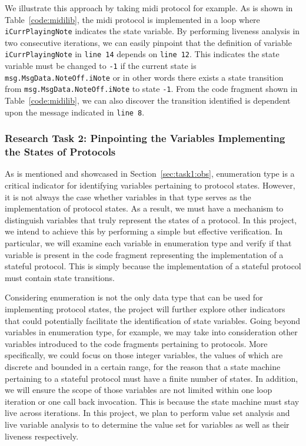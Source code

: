 We illustrate this approach by taking midi protocol for example. As is shown in
Table~\ref{code:midilib},  the midi protocol is implemented in a loop where
\texttt{iCurrPlayingNote} indicates the state variable. By performing liveness
analysis in two consecutive iterations, we can easily pinpoint that 
the definition of variable \texttt{iCurrPlayingNote} in
\texttt{line 14} depends on \texttt{line 12}.
This indicates the state variable must be changed to
\texttt{-1} if the current state is \texttt{msg.MsgData.NoteOff.iNote} or in
other words there exists a state transition from
\texttt{msg.MsgData.NoteOff.iNote} to state \texttt{-1}. From the code fragment
shown in Table~\ref{code:midilib}, we can also discover  the transition
identified is dependent upon the message indicated in \texttt{line 8}.




\subsubsection{Research Task 2: Pinpointing the Variables Implementing the
States of Protocols}
\label{subsec:rt2}

As is mentioned and showcased in Section~\ref{sec:task1:obs}, enumeration type
is a critical indicator for identifying variables pertaining to protocol states.
However, it is not always the case whether variables in that type serves as the
implementation of protocol states. As a result, we must have a mechanism to
distinguish variables that truly represent the states of a protocol. In this
project, we intend to achieve this by performing a simple but effective
verification. In particular, we will examine each variable in enumeration type
and verify if that variable is present in the code fragment representing the
implementation of a stateful protocol. This is simply because the implementation
of a stateful protocol must contain state transitions.

Considering enumeration is not the only data type that can be used for
implementing protocol states, the project will further explore other indicators
that could  potentially facilitate the identification of state variables. Going
beyond variables in enumeration type, for example, we may take into consideration
other variables introduced to the code fragments pertaining to protocols. More
specifically, we could focus on those integer variables, the values of which
are discrete and bounded in a certain range, for the reason that a state machine
pertaining to a stateful protocol must have a finite number of states. In
addition, we will ensure the scope of those variables are not limited within 
one loop iteration or one call back invocation. This is because the state machine must stay
live across iterations.
In this project, we plan to perform value set analysis
and live variable analysis to  to determine the value set for variables as well
as their liveness respectively.

